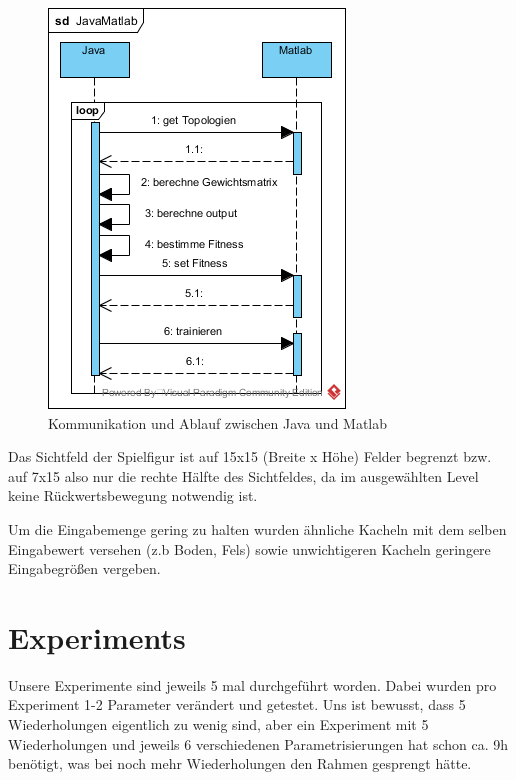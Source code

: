 \documentclass{hbrs-ecta-report}
\begin{document}
\begin{figure}[h!]
	\centering
	\includegraphics[width=\linewidth]{img/JavaMatlab.png}
	\caption{Kommunikation und Ablauf zwischen Java und Matlab}
	\label{fig:sequenzdiagramm} 
\end{figure}

Das Sichtfeld der Spielfigur ist auf 15x15 (Breite x Höhe) Felder begrenzt bzw. auf 7x15 also nur die rechte Hälfte des Sichtfeldes, da im ausgewählten Level keine Rückwertsbewegung notwendig ist.

Um die Eingabemenge gering zu halten wurden ähnliche Kacheln mit dem selben Eingabewert versehen (z.b Boden, Fels) sowie unwichtigeren Kacheln geringere Eingabegrößen vergeben.

\FloatBarrier
\section{Experiments}
Unsere Experimente sind jeweils 5 mal durchgeführt worden. Dabei wurden pro Experiment 1-2 Parameter verändert und getestet. Uns ist bewusst, dass 5 Wiederholungen eigentlich zu wenig sind, aber ein Experiment mit 5 Wiederholungen und jeweils 6 verschiedenen Parametrisierungen hat schon ca. 9h benötigt, was bei noch mehr Wiederholungen den Rahmen gesprengt hätte.
\end{document}
